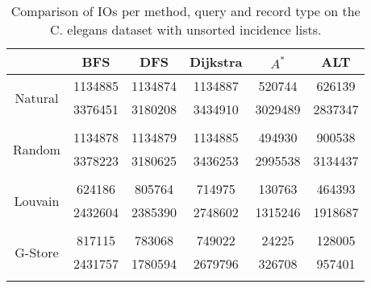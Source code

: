 \begin{table}
	\begin{center}
		 \begin{tabular}[c]{c c c c c c} \toprule
			  & BFS & DFS & Dijkstra & $A^*$  & ALT \\ \midrule 
 			\multirow{2}{*}{Natural}  & 1134885 & 1134874 & 1134887 & 520744 & 626139 \\ 
 				 & 3376451 & 3180208 & 3434910 & 3029489 & 2837347 \\ 
 				&&&&& \\[-0.5em]
 			\multirow{2}{*}{Random}  & 1134878 & 1134879 & 1134885 & 494930 & 900538 \\ 
 				 & 3378223 & 3180625 & 3436253 & 2995538 & 3134437 \\ 
 				&&&&& \\[-0.5em]
 			\multirow{2}{*}{Louvain}  & 624186 & 805764 & 714975 & 130763 & 464393 \\ 
 				 & 2432604 & 2385390 & 2748602 & 1315246 & 1918687 \\ 
 				&&&&& \\[-0.5em]
 			\multirow{2}{*}{G-Store}  & 817115 & 783068 & 749022 & 24225 & 128005 \\ 
 				 & 2431757 & 1780594 & 2679796 & 326708 & 957401 \\ 
 				&&&&& \\[-0.5em]
 					\end{tabular}  
  	 \end{center}
	 \caption{Comparison of IOs per method, query and record type on the C. elegans dataset with unsorted incidence lists.}
	 \label{yt-uns}
\end{table}

